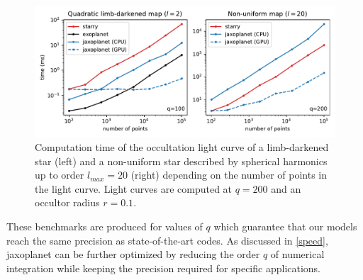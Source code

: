 \documentclass[modern]{aastex631}
\begin{document}
\begin{figure}[H]
    \begin{center}
        \includegraphics[width=\textwidth]{../workflows/speed/figures/speed_vs_N.pdf}
        \caption{Computation time of the occultation light curve of a limb-darkened star (left) and a non-uniform star described by spherical harmonics up to order $l_{max}=20$ (right) depending on the number of points in the light curve. Light curves are computed at $q=200$ and an occultor radius $r=0.1$. }
        \label{fig:speed_N}
    \end{center}
\end{figure}
These benchmarks are produced for values of $q$ which guarantee that our models reach the same precision as state-of-the-art codes. As discussed in \autoref{speed}, \textsf{jaxoplanet} can be further optimized by reducing the order $q$ of numerical integration while keeping the precision required for specific applications.

\end{document}
